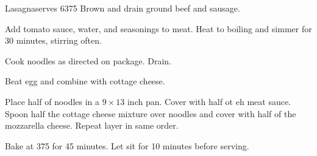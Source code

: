 
\begin{recipe}{Lasagna}{serves 6}{375\0}
    Brown and drain ground beef and sausage.

    Add tomato sauce, water, and seasonings to meat. Heat to boiling and simmer for 30 minutes, stirring often.

    Cook noodles as directed on package. Drain.

    Beat egg and combine with cottage cheese.

    Place half of noodles in a $9 \times 13$ inch pan. Cover with half ot eh meat sauce. Spoon half the cottage cheese mixture over noodles and cover with half of the mozzarella cheese. Repeat layer in same order.

    \newstep
    Bake at 375\0 for 45 minutes. Let sit for 10 minutes before serving.
\end{recipe}
